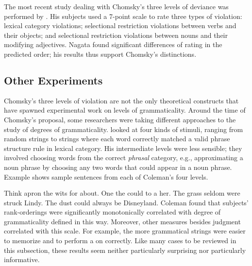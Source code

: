 The most recent study dealing with Chomsky's three levels of deviance was performed by \citet{Nagata1990b}. His subjects used a 7-point scale to rate three types of violation: lexical category violations; selectional restriction violations between verbs and their objects; and selectional restriction violations between nouns and their modifying adjectives. Nagata found significant differences of rating in the predicted  order; his results thus support Chomsky's distinctions.

\subsection{Other Experiments}\label{sec:3.3.3}

Chomsky's three levels of violation are not the only theoretical constructs that have spawned experimental work on levels of grammaticality. Around the time of Chomsky's proposal, some researchers were taking different approaches to the
study of degrees of grammaticality. \citet{Coleman1965} looked at four kinds of stimuli, ranging from random strings to strings where each word correctly matched a valid phrase structure rule in lexical category. His intermediate levels were less
sensible; they involved choosing words from the correct \textit{phrasal} category, e.g., approximating a noun phrase by choosing any two words that could appear in a noun phrase. Example  shows sample sentences from each of Coleman's four levels.

\ea \label{ex:3:7}
\ea Think apron the wits for about. 
\ex One the could to a her.
\ex The grass seldom were struck Lindy.
\ex The dust could always be Disneyland.
\z
\z
\noindent
Coleman found that subjects' rank-orderings were significantly monotonically correlated with degree of grammaticality defined in this way. Moreover, other measures besides judgment correlated with this scale. For example, the more grammatical strings were easier to memorize and to perform a  \citep{Taylor1953} on correctly. Like many cases to be reviewed in this subsection, these results seem neither particularly surprising nor particularly informative.

